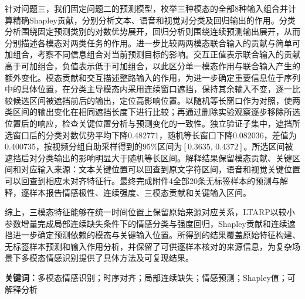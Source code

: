 针对问题三，我们固定问题二的预测模型，枚举三种模态的全部8种输入组合并计算精确Shapley贡献，分别分析文本、语音和视觉对分类及回归输出的作用。分类分析围绕固定预测类别的对数优势展开，回归分析则围绕连续预测输出展开，从而分别描述各模态对两类任务的作用。进一步比较两两模态联合输入的贡献与简单可加组合，考察不同信息组合对当前预测目标的影响。交互正值表示联合输入的贡献高于可加组合，负值表示低于可加组合，以此区分单一模态作用与联合输入产生的额外变化。模态贡献和交互描述整路输入的作用，为进一步确定重要信息位于序列中的具体位置，在分类主导模态内采用连续窗口遮挡，保持其余输入不变，逐一比较候选区间被遮挡前后的输出，定位高影响位置。以随机等长窗口作为对照，使两类区间的输出变化在相同遮挡长度下进行比较；再通过删除实验观察逐步移除所选位置后的响应，检查关键位置分析与预测变化的一致性。独立验证子集中，遮挡所选窗口后的分类对数优势平均下降0.482771，随机等长窗口下降0.082036，差值为0.400735，按视频分组自助采样得到的95\%区间为$[0.3635,\,0.4372]$。所选区间被遮挡后对分类输出的影响明显大于随机等长区间。解释结果保留模态贡献、关键区间和对应输入来源：文本关键位置可以回查到原文字符区间，语音和视觉关键位置可以回查到相应未对齐特征行。最终完成附件4全部20条无标签样本的预测与解释，逐样本报告情感极性、连续强度、三模态贡献和关键输入区间。

综上，三模态特征能够在统一时间位置上保留原始来源对应关系，LTARP以较小参数增量完成局部连续缺失条件下的情感分类与强度回归，Shapley贡献和连续遮挡进一步确定预测依赖的模态与关键输入位置。所得到的结果覆盖原始特征构建、无标签样本预测和输入作用分析，并保留了可供逐样本核对的来源信息，为复杂场景下多模态情感识别提供了具体方法及可复现结果。

\par\vspace{0.7\baselineskip}
\noindent\textbf{关键词：}多模态情感识别；时序对齐；局部连续缺失；情感预测；Shapley值；可解释分析
